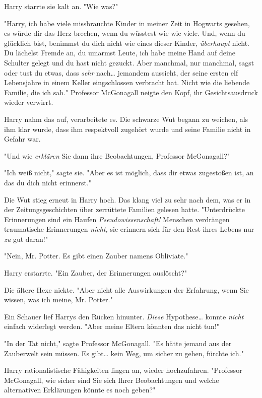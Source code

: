 {Harry starrte sie kalt an. "Wie was?"

"Harry, ich habe viele missbrauchte Kinder in meiner Zeit in Hogwarts gesehen, es würde dir das Herz brechen, wenn du wüsstest wie wie viele. Und, wenn du glücklich bist, benimmst du dich nicht wie eines dieser Kinder, \emph{überhaupt} nicht. Du lächelst Fremde an, du umarmst Leute, ich habe meine Hand auf deine Schulter gelegt und du hast nicht gezuckt. Aber manchmal, nur manchmal, sagst oder tust du etwas, dass \emph{sehr} nach… jemandem aussieht, der seine ersten elf Lebensjahre in einem Keller eingschlossen verbracht hat. Nicht wie die liebende Familie, die ich sah." Professor McGonagall neigte den Kopf, ihr Gesichtsausdruck wieder verwirrt.

Harry nahm das auf, verarbeitete es. Die schwarze Wut begann zu weichen, als ihm klar wurde, dass ihm respektvoll zugehört wurde und seine Familie nicht in Gefahr war.

"Und wie \emph{erklären} Sie dann ihre Beobachtungen, Professor McGonagall?"

"Ich weiß nicht," sagte sie. "Aber es ist möglich, dass dir etwas zugestoßen ist, an das du dich nicht erinnerst."

Die Wut stieg erneut in Harry hoch. Das klang viel zu sehr nach dem, was er in der Zeitungsgeschichten über zerrüttete Familien gelesen hatte. "Unterdrückte Erinnerungen sind ein Haufen \emph{Pseudowissenschaft!} Menschen verdrängen traumatische Erinnerungen \emph{nicht,} sie erinnern sich für den Rest ihres Lebens nur \emph{zu} gut daran!"

"Nein, Mr. Potter. Es gibt einen Zauber namens Obliviate."

Harry erstarrte. "Ein Zauber, der Erinnerungen auslöscht?"

Die ältere Hexe nickte. "Aber nicht alle Auswirkungen der Erfahrung, wenn Sie wissen, was ich meine, Mr. Potter."

Ein Schauer lief Harrys den Rücken hinunter. \emph{Diese} Hypothese… konnte \emph{nicht} einfach widerlegt werden. "Aber meine Eltern könnten das nicht tun!"

"In der Tat nicht," sagte Professor McGonagall. "Es hätte jemand aus der Zauberwelt sein müssen. Es gibt… kein Weg, um sicher zu gehen, fürchte ich."

Harry rationalistische Fähigkeiten fingen an, wieder hochzufahren. "Professor McGonagall, wie sicher sind Sie sich Ihrer Beobachtungen und welche alternativen Erklärungen könnte es noch geben?"

}
